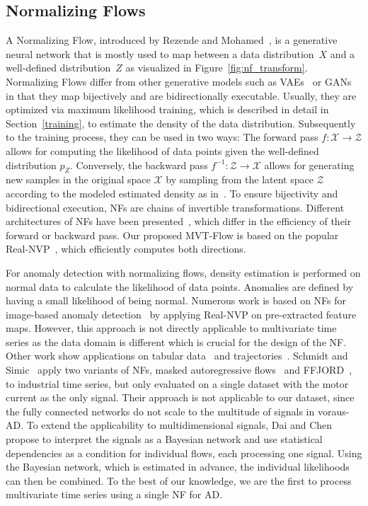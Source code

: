 \documentclass[journal]{IEEEtran}
\newcommand\datasetname{voraus-AD}
\begin{document}
\subsection{Normalizing Flows}
\label{nf_related}
A Normalizing Flow, introduced by Rezende and Mohamed~\cite{nf}, is a generative neural network that is mostly used to map between a data distribution~$X$ and a well-defined distribution~$Z$ as visualized in Figure~\ref{fig:nf_transform}.
Normalizing Flows differ from other generative models such as VAEs~\cite{vae} or GANs~\cite{gan} in that they map bijectively and are bidirectionally executable.
Usually, they are optimized via maximum likelihood training, which is described in detail in Section~\ref{training}, to estimate the density of the data distribution.
Subsequently to the training process, they can be used in two ways:
The forward pass $f:\mathcal{X}\rightarrow \mathcal{Z}$ allows for computing the likelihood of data points given the well-defined distribution $p_Z$.
Conversely, the backward pass $f^{-1}:\mathcal{Z}\rightarrow \mathcal{X}$ allows for generating new samples in the original space $\mathcal{X}$ by sampling from the latent space $\mathcal{Z}$ according to the modeled estimated density as in~\cite{kingma2018glow, tomINN}.
To ensure bijectivity and bidirectional execution, NFs are chains of invertible transformations.
Different architectures of NFs have been presented~\cite{realnvp, kingma, germain, maf}, which differ in the efficiency of their forward or backward pass.
Our proposed MVT-Flow is based on the popular Real-NVP~\cite{realnvp}, which efficiently computes both directions.

For anomaly detection with normalizing flows, density estimation is performed on normal data to calculate the likelihood of data points.
Anomalies are defined by having a small likelihood of being normal.
Numerous work is based on NFs for image-based anomaly detection~\cite{differnet, csflow, cflow, yan2022cainnflow, ast} by applying Real-NVP on pre-extracted feature maps.
However, this approach is not directly applicable to multivariate time series as the data domain is different which is crucial for the design of the NF.
Other work show applications on tabular data~\cite{nf_deep} and trajectories~\cite{nf_trajectory}.
Schmidt and Simic~\cite{nf_time_series} apply two variants of NFs, masked autoregressive flows~\cite{maf} and FFJORD~\cite{ffjord}, to industrial time series, but only evaluated on a single dataset with the motor current as the only signal.
Their approach is not applicable to our dataset, since the fully connected networks do not scale to the multitude of signals in \datasetname{}.
{To extend the applicability to multidimensional signals, Dai and Chen~\cite{GANF} propose to interpret the signals as a Bayesian network and use statistical dependencies as a condition for individual flows, each processing one signal.
Using the Bayesian network, which is estimated in advance, the individual likelihoods can then be combined.
To the best of our knowledge, we are the first to process multivariate time series using a single NF for AD.}
\end{document}
